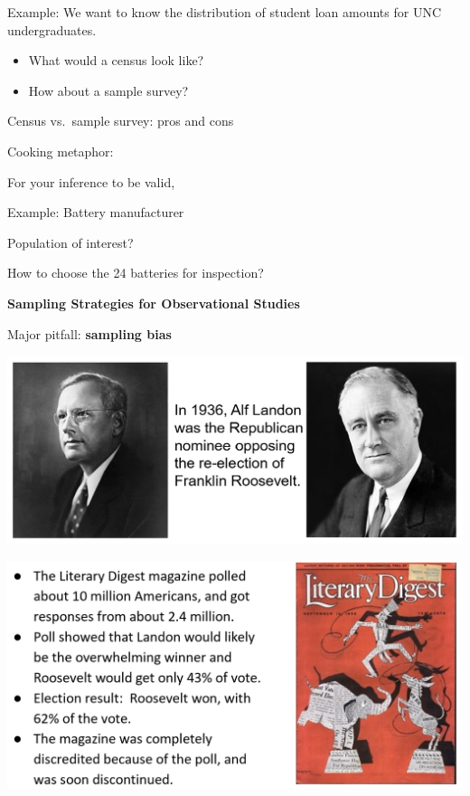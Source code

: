 \documentclass[11pt,letterpaper,twoside]{article}
\begin{document}
Example: We want to know the distribution of student loan amounts for UNC undergraduates.
\begin{itemize}
\item What would a census look like? \vspace{100pt}

\item How about a sample survey?
\end{itemize}

\newpage

Census vs.\ sample survey: pros and cons \vspace{200pt}

Cooking metaphor:  \vspace{80pt}

For your inference to be valid, \vspace{80pt}

Example: Battery manufacturer \vspace{30pt}

Population of interest? \vspace{40pt}

How to choose the 24 batteries for inspection?

\newpage

{\bf Sampling Strategies for Observational Studies} \vspace{6pt}

Major pitfall: {\bf sampling bias}

\begin{center}
\includegraphics[scale=0.8]{images/fdr.png}

\includegraphics[scale=0.8]{images/fdr2.png}
\end{center}
\end{document}
